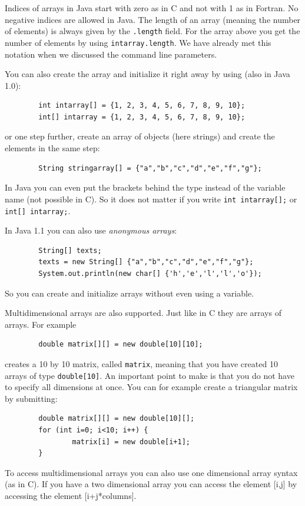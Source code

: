 Indices of arrays in Java start with zero as in C and not with 1
as in Fortran. No negative indices are allowed in Java. The length
of an array (meaning the number of elements) is always given
by the \verb|.length| field. For the array above you get the number
of elements by using \verb|intarray.length|. We have already met
this notation when we discussed the command line parameters.

You can also create the array and initialize it right away by using
(also in Java 1.0):
\begin{verbatim}
        int intarray[] = {1, 2, 3, 4, 5, 6, 7, 8, 9, 10};
        int[] intarray = {1, 2, 3, 4, 5, 6, 7, 8, 9, 10};
\end{verbatim}
or one step further, create an array of objects (here strings) and
create the elements in the same step:
\begin{verbatim}
        String stringarray[] = {"a","b","c","d","e","f","g"};
\end{verbatim}
In Java you can even put the brackets behind the type instead of the
variable name (not possible in C). So it does not matter if you
write \verb|int intarray[];| or \verb|int[] intarray;|.

In Java 1.1 you can also use \emph{anonymous arrays}:
\begin{verbatim}
        String[] texts;
        texts = new String[] {"a","b","c","d","e","f","g"};
        System.out.println(new char[] {'h','e','l','l','o'});
\end{verbatim}
So you can create and initialize arrays without even using a variable.

Multidimensional arrays are also supported. Just like in C they are
arrays of arrays. For example
\begin{verbatim}
        double matrix[][] = new double[10][10]; 
\end{verbatim}
creates a 10 by 10 matrix, called \verb|matrix|, 
meaning that you have created 10 arrays
of type \verb|double[10]|. An important point to make is that you
do not have to specify all dimensions at once. You can for example
create a triangular matrix by submitting:
\begin{verbatim}
        double matrix[][] = new double[10][];
        for (int i=0; i<10; i++) {
                matrix[i] = new double[i+1];
        } 
\end{verbatim}
To access multidimensional arrays you can also use one dimensional
array syntax (as in C). If you have a two dimensional array 
you can access the element [i,j] by accessing the element [i+j*columns]. 

